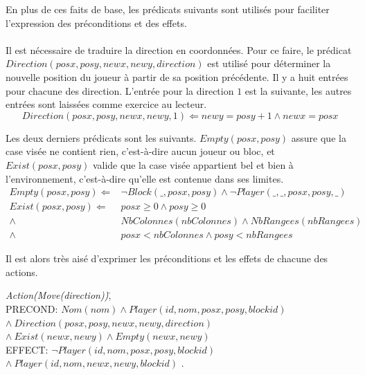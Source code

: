 \documentclass[12pt,english,frenchb,letterpaper]{article}
\begin{document}
En plus de ces faits de base, les prédicats suivants sont utilisés pour faciliter l'expression des préconditions et des effets. \\
\\
Il est nécessaire de traduire la direction en coordonnées. Pour ce faire, le prédicat $Direction(posx,posy,newx,newy,direction)$ est utilisé pour déterminer la nouvelle position du joueur à partir de sa position précédente.  Il y a huit entrées pour chacune des direction.  L'entrée pour la direction $1$ est la suivante, les autres entrées sont laissées comme exercice au lecteur.
\begin{equation*}
	Direction(posx,posy,newx,newy, 1) \Leftarrow newy = posy + 1 \wedge newx = posx 
\end{equation*}

Les deux derniers prédicats sont les suivants.  $Empty(posx,posy)$ assure que la case visée ne contient rien, c'est-à-dire aucun joueur ou bloc, et $Exist(posx,posy)$ valide que la case visée appartient bel et bien à l'environnement, c'est-à-dire qu'elle est contenue dans ses limites.
\begin{eqnarray*}
	Empty(posx,posy) \Leftarrow & \lnot Block(\_,posx,posy)  \wedge \lnot Player(\_,\_,posx,posy,\_) \\
	Exist(posx,posy) \Leftarrow & posx  \geq 0 \wedge posy \geq 0 \\
	                                                    \wedge & NbColonnes(nbColonnes)  \wedge NbRangees(nbRangees) \\
	                                                   \wedge & posx < nbColonnes \wedge posy < nbRangees 
\end{eqnarray*}

Il est alors très aisé d'exprimer les préconditions et les effets de chacune des actions.

\begin{tabbing}
\textit{Action}\=\textit{(Move(direction))}\=,\\
\> PRECOND: \> $Nom(nom) \wedge Player(id,nom,posx,posy,blockid)$ \\ 
\> \> $  \wedge \ Direction(posx,posy,newx,newy,direction) $ \\
\> \> $   \wedge \ Exist(newx,newy) \wedge Empty(newx,newy) $ \\               
\> EFFECT: \>$ \lnot Player(id,nom,posx,posy,blockid) $ \\
\>  \> $\wedge\ Player(id,nom,newx,newy,blockid)$ .\\
\end{tabbing}
\end{document}
